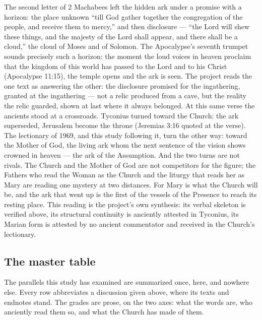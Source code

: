\begin{synthesisbox}
The second letter of 2 Machabees left the hidden ark under a promise with a
horizon: the place unknown ``till God gather together the congregation of
the people, and receive them to mercy,'' and then disclosure --- ``the Lord
will shew these things, and the majesty of the Lord shall appear, and there
shall be a cloud,'' the cloud of Moses and of Solomon. The Apocalypse's
seventh trumpet sounds precisely such a horizon: the moment the loud
voices in heaven proclaim that the kingdom of this world has passed to the
Lord and to his Christ (Apocalypse 11:15), the temple opens and the ark is
seen. The project reads the one text as answering the other: the disclosure
promised for the ingathering, granted at the ingathering --- not a relic
produced from a cave, but the reality the relic guarded, shown at last
where it always belonged. At this same verse the ancients stood at a
crossroads. Tyconius turned toward the Church: the ark superseded, Jerusalem
become the throne (Jeremias 3:16 quoted at the verse). The lectionary of
1969, and this study following it, turn the other way: toward
the Mother of God, the living ark whom the next sentence
of the vision shows crowned in heaven --- the ark of the Assumption. And
the two turns are not rivals. The Church and the Mother of God are not
competitors for the figure; the Fathers who read the Woman as the Church
and the liturgy that reads her as Mary are reading one mystery at two
distances. For Mary is what the Church will be, and the ark that went up is
the first of the vessels of the Presence to reach its resting place. This
reading is the project's own synthesis: its verbal skeleton is verified
above, its structural continuity is anciently attested in Tyconius, its
Marian form is attested by no ancient commentator and received in the
Church's lectionary.
\end{synthesisbox}

\par\noindent
\begin{minipage}{\linewidth}

\end{minipage}\par

\subsection{The master table}

The parallels this study has examined are summarized once, here, and
nowhere else. Every row abbreviates a discussion given above, where its
texts and endnotes stand. The grades are prose, on the
two axes: what the words are, who anciently read them so, and what the
Church has made of them.

